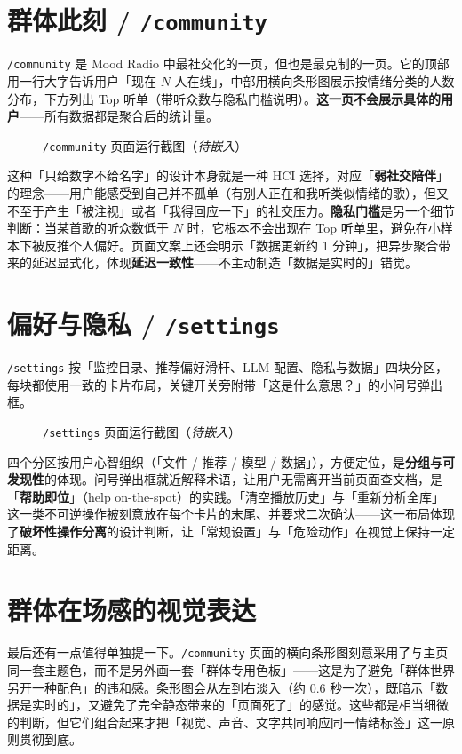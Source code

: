 \section{群体此刻 / \texttt{/community}}

\texttt{/community} 是 Mood Radio 中最社交化的一页，但也是最克制的一页。它的顶部用一行大字告诉用户「现在 $N$ 人在线」，中部用横向条形图展示按情绪分类的人数分布，下方列出 Top 听单（带听众数与隐私门槛说明）。\textbf{这一页不会展示具体的用户}——所有数据都是聚合后的统计量。

\begin{figure}[!htb]
  \centering
  \fbox{\rule{0pt}{5.5cm}\hspace{12.5cm}}
  \caption{\texttt{/community} 页面运行截图（\textit{待嵌入}）}\label{fig:community}
\end{figure}

这种「只给数字不给名字」的设计本身就是一种 HCI 选择，对应「\textbf{弱社交陪伴}」的理念——用户能感受到自己并不孤单（有别人正在和我听类似情绪的歌），但又不至于产生「被注视」或者「我得回应一下」的社交压力。\textbf{隐私门槛}是另一个细节判断：当某首歌的听众数低于 $N$ 时，它根本不会出现在 Top 听单里，避免在小样本下被反推个人偏好。页面文案上还会明示「数据更新约 1 分钟」，把异步聚合带来的延迟显式化，体现\textbf{延迟一致性}——不主动制造「数据是实时的」错觉。

\section{偏好与隐私 / \texttt{/settings}}

\texttt{/settings} 按「监控目录、推荐偏好滑杆、LLM 配置、隐私与数据」四块分区，每块都使用一致的卡片布局，关键开关旁附带「这是什么意思？」的小问号弹出框。

\begin{figure}[!htb]
  \centering
  \fbox{\rule{0pt}{6cm}\hspace{12.5cm}}
  \caption{\texttt{/settings} 页面运行截图（\textit{待嵌入}）}\label{fig:settings}
\end{figure}

四个分区按用户心智组织（「文件 / 推荐 / 模型 / 数据」），方便定位，是\textbf{分组与可发现性}的体现。问号弹出框就近解释术语，让用户无需离开当前页面查文档，是「\textbf{帮助即位}」（help on-the-spot）的实践。「清空播放历史」与「重新分析全库」这一类不可逆操作被刻意放在每个卡片的末尾、并要求二次确认——这一布局体现了\textbf{破坏性操作分离}的设计判断，让「常规设置」与「危险动作」在视觉上保持一定距离。

\section{群体在场感的视觉表达}

最后还有一点值得单独提一下。\texttt{/community} 页面的横向条形图刻意采用了与主页同一套主题色，而不是另外画一套「群体专用色板」——这是为了避免「群体世界另开一种配色」的违和感。条形图会从左到右淡入（约 0.6 秒一次），既暗示「数据是实时的」，又避免了完全静态带来的「页面死了」的感觉。这些都是相当细微的判断，但它们组合起来才把「视觉、声音、文字共同响应同一情绪标签」这一原则贯彻到底。
